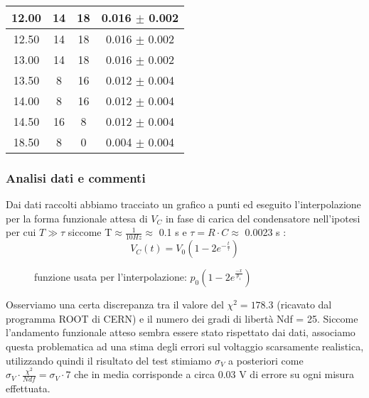 \documentclass[a4paper]{article}
\theoremstyle{definition}
\begin{document}
\begin{table}[!htbp]
{\begin{minipage}{.7\linewidth}
\begin{tabular}{c|cc|c}
       \hline
       12.00& 14&18 &0.016  \(\pm\)  0.002\\
       \hline
       12.50 & 14& 18 & 0.016  \(\pm\) 0.002\\
       \hline
       13.00 & 14& 18 &   0.016  \(\pm\) 0.002\\
       \hline
       13.50 & 8& 16   &  0.012  \(\pm\) 0.004\\
       \hline
       14.00& 8&16&0.012 \(\pm\) 0.004\\
       \hline
       14.50& 16& 8 &0.012  \(\pm\) 0.004\\
       \hline
       18.50 & 8& 0 & 0.004 \(\pm\) 0.004 \\
        \hline
        \hline
    \end{tabular}
    \end{minipage} 
        }

\end{table}


\pagebreak

\subsubsection*{Analisi dati e commenti}

Dai dati raccolti abbiamo tracciato un grafico a punti ed eseguito l'interpolazione per la forma funzionale attesa di \(V_{C}\) in fase di carica del condensatore nell'ipotesi per cui \(T \gg \tau\) siccome T\( \approx \frac{1}{10 Hz} \approx\) 0.1 s e \(\tau = R \cdot C \approx\) 0.0023 s : 
\[V_{C}(t) = V_{0} \left(1 - 2 e^{-\frac{t}{\tau}}\right) \]
\begin{figure}[!htbp]

	\caption{funzione usata per l'interpolazione:  \(p_{0} (1 - 2e^{\frac{-x}{p_{1}}} )\)}

    \label{fig:RC_su_C}

\end{figure}

\noindent Osserviamo una certa discrepanza tra il valore del \(\chi^{2} = 178.3\) (ricavato dal programma ROOT di CERN) e il numero dei gradi di libertà Ndf = 25. Siccome l'andamento funzionale atteso sembra essere stato rispettato dai dati, associamo questa problematica ad una stima degli errori sul voltaggio scarsamente realistica, utilizzando quindi il risultato del test stimiamo \(\sigma_{V}\) a posteriori come \(\sigma_{V} \cdot \frac{\chi^{2}}{Ndf} = \sigma_{V} \cdot 7\) che in media corrisponde a circa 0.03 V di errore su ogni misura effettuata. \\
\end{document}

